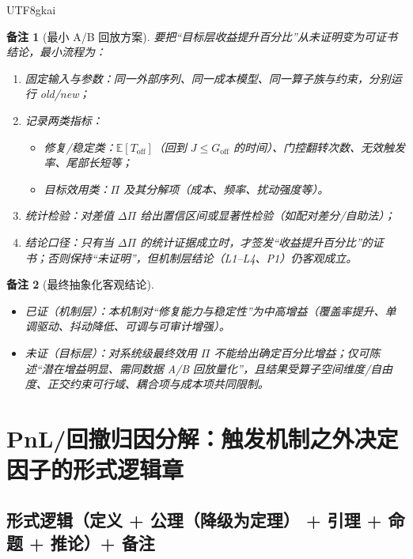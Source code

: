 \documentclass[12pt]{article}
\newtheorem{remark}{备注}[section]
\begin{document}
\begin{CJK*}{UTF8}{gkai}
\begin{remark}[最小 A/B 回放方案]
要把“目标层收益提升百分比”从未证明变为可证书结论，最小流程为：
\begin{enumerate}
  \item 固定输入与参数：同一外部序列、同一成本模型、同一算子族与约束，分别运行 old/new；
  \item 记录两类指标：
  \begin{itemize}
    \item 修复/稳定类：$\mathbb{E}[T_{\mathrm{off}}]$（回到 $J\le G_{\mathrm{off}}$ 的时间）、门控翻转次数、无效触发率、尾部长短等；
    \item 目标效用类：$\Pi$ 及其分解项（成本、频率、扰动强度等）。
  \end{itemize}
  \item 统计检验：对差值 $\Delta\Pi$ 给出置信区间或显著性检验（如配对差分/自助法）；
  \item 结论口径：只有当 $\Delta\Pi$ 的统计证据成立时，才签发“收益提升百分比”的证书；否则保持“未证明”，但机制层结论（L1--L4、P1）仍客观成立。
\end{enumerate}
\end{remark}

\begin{remark}[最终抽象化客观结论]
\begin{itemize}
  \item 已证（机制层）：本机制对“修复能力与稳定性”为中高增益（覆盖率提升、单调驱动、抖动降低、可调与可审计增强）。
  \item 未证（目标层）：对系统级最终效用 $\Pi$ 不能给出确定百分比增益；仅可陈述“潜在增益明显、需同数据 A/B 回放量化”，且结果受算子空间维度/自由度、正交约束可行域、耦合项与成本项共同限制。
\end{itemize}
\end{remark}

\clearpage

\section{PnL/回撤归因分解：触发机制之外决定因子的形式逻辑章}
\label{sec:tex28-ch6}

\subsection{形式逻辑（定义 + 公理（降级为定理） + 引理 + 命题 + 推论）+ 备注}
\label{subsec:tex28-ch6-logic-structure}


\end{CJK*}
\end{document}
